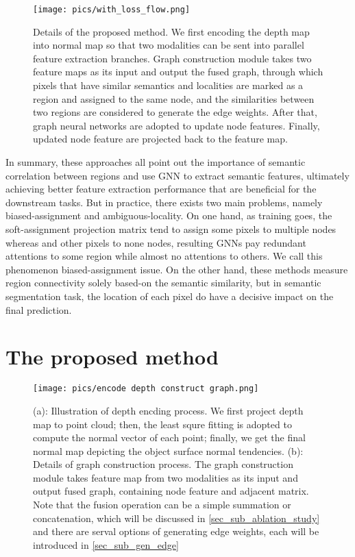 ﻿\documentclass[journal]{IEEEtran}
\begin{document}
    \begin{figure*}
        \centering
        \texttt{[image: pics/with\_loss\_flow.png]}
        \caption{Details of the proposed method. We first encoding the depth map into normal map so that two modalities can be sent into parallel feature extraction branches. Graph construction module takes two feature maps as its input and output the fused graph, through which pixels that have similar semantics and localities are marked as a region and assigned to the same node, and the similarities between two regions are considered to generate the edge weights. After that, graph neural networks are adopted to update node features. Finally, updated node feature are projected back to the feature map. }
        \label{fig_overview}
    \end{figure*}
    
    In summary, these approaches all point out the importance of semantic correlation between regions and use GNN to extract semantic features, ultimately achieving better feature extraction performance that are beneficial for the downstream tasks. But in practice, there exists two main problems, namely biased-assignment and ambiguous-locality. On one hand, as training goes, the soft-assignment projection matrix tend to assign some pixels to multiple nodes whereas and other pixels to none nodes, resulting GNNs pay redundant attentions to some region while almost no attentions to others. We call this phenomenon biased-assignment issue. On the other hand, these methods measure region connectivity   solely based-on the semantic similarity, but in semantic segmentation task, the location of each pixel do have a decisive impact on the final prediction.  \\   

\section{The proposed method}  \label{sec_method}


\begin{figure*}
    \centering
    \texttt{[image: pics/encode depth construct graph.png]}
    \caption{(a): Illustration of depth encding process. We first project depth map to point cloud; then, the least squre fitting is adopted to compute the normal vector of each point; finally, we get the final normal map depicting the object surface normal tendencies. (b): Details of graph construction process. The graph construction module takes feature map from two modalities as its input and output fused graph, containing node feature and adjacent matrix. Note that the fusion operation can be a simple summation or concatenation, which will be discussed in \ref{sec_sub_ablation_study} and there are serval options of generating edge weights, each will be introduced in \ref{sec_sub_gen_edge} }
    \label{fig_depth_encoding_and_graph_construction}
\end{figure*}
\end{document}
